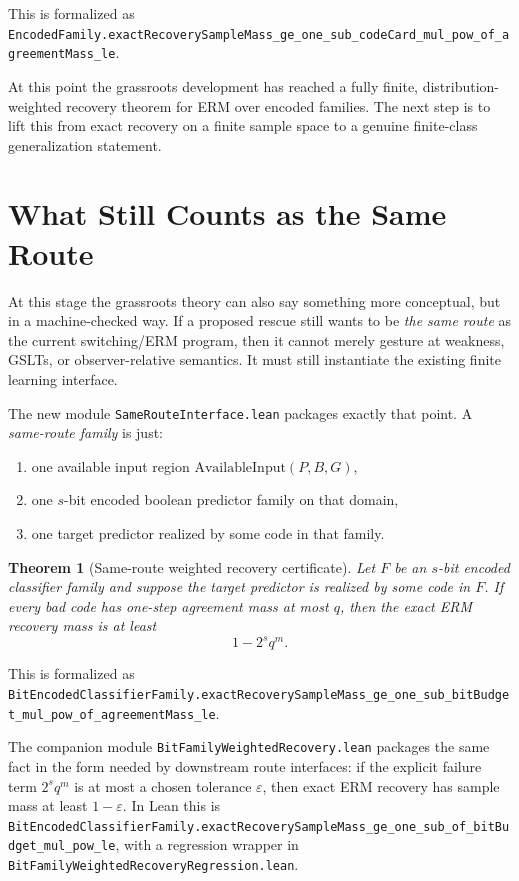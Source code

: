 \documentclass[11pt]{article}
\newtheorem{theorem}{Theorem}[section]
\theoremstyle{remark}
\begin{document}
\noindent
This is formalized as
\texttt{EncodedFamily.exactRecoverySampleMass\_ge\_one\_sub\_codeCard\_mul\_pow\_of\_agreementMass\_le}.

At this point the grassroots development has reached a fully finite,
distribution-weighted recovery theorem for ERM over encoded families.  The next
step is to lift this from exact recovery on a finite sample space to a genuine
finite-class generalization statement.

\section{What Still Counts as the Same Route}

At this stage the grassroots theory can also say something more conceptual, but
in a machine-checked way.  If a proposed rescue still wants to be \emph{the same
route} as the current switching/ERM program, then it cannot merely gesture at
weakness, GSLTs, or observer-relative semantics.  It must still instantiate the
existing finite learning interface.

The new module \texttt{SameRouteInterface.lean} packages exactly that point.  A
\emph{same-route family} is just:
\begin{enumerate}[leftmargin=1.5em]
  \item one available input region \(\mathrm{AvailableInput}(P,B,G)\),
  \item one \(s\)-bit encoded boolean predictor family on that domain,
  \item one target predictor realized by some code in that family.
\end{enumerate}

\begin{theorem}[Same-route weighted recovery certificate]
Let \(F\) be an \(s\)-bit encoded classifier family and suppose the target
predictor is realized by some code in \(F\).  If every bad code has one-step
agreement mass at most \(q\), then the exact ERM recovery mass is at least
\[
  1 - 2^s q^m.
\]
\end{theorem}

\noindent
This is formalized as
\texttt{BitEncodedClassifierFamily.exactRecoverySampleMass\_ge\_one\_sub\_bitBudget\_mul\_pow\_of\_agreementMass\_le}.

The companion module \texttt{BitFamilyWeightedRecovery.lean} packages the same
fact in the form needed by downstream route interfaces: if the explicit failure
term \(2^s q^m\) is at most a chosen tolerance \(\varepsilon\), then exact ERM
recovery has sample mass at least \(1-\varepsilon\).  In Lean this is
\texttt{BitEncodedClassifierFamily.exactRecoverySampleMass\_ge\_one\_sub\_of\_bitBudget\_mul\_pow\_le},
with a regression wrapper in
\texttt{BitFamilyWeightedRecoveryRegression.lean}.
\end{document}
